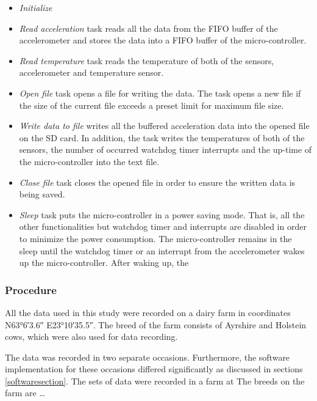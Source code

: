 \documentclass[english,12pt,a4paper,pdftex,elec,utf8]{aaltothesis}
\begin{document}
\begin{itemize}
\item \textit{Initialize}

\item \textit{Read acceleration} task reads all the data from the FIFO buffer of the accelerometer and stores the data into a FIFO buffer of the micro-controller.

\item \textit{Read temperature} task reads the temperature of both of the sensors, accelerometer and temperature sensor.

\item \textit{Open file} task opens a file for writing the data. The task opens a new file if the size of the current file exceeds a preset limit for maximum file size.

\item \textit{Write data to file} writes all the buffered acceleration data into the opened file on the SD card. In addition, the task writes the temperatures of both of the sensors, the number of occurred watchdog timer interrupts and the up-time of the micro-controller into the text file.

\item \textit{Close file} task closes the opened file in order to ensure the written data is being saved. 

\item \textit{Sleep} task puts the micro-controller in a power saving mode. That is, all the other functionalities but watchdog timer and interrupts are disabled in order to minimize the power consumption. The micro-controller remains in the sleep until the watchdog timer or an interrupt from the accelerometer wakes up the micro-controller. After waking up, the 

\end{itemize}

\subsubsection{Procedure} \label{proceduresection}

All the data used in this study were recorded on a dairy farm in coordinates N\ang{63;6;3.6} E\ang{23;10;35.5}. The breed of the farm consists of Ayrshire and Holstein cows, which were also used for data recording. 

The data was recorded in two separate occasions. Furthermore, the software implementation for these occasions differed significantly as discussed in sections \ref{softwaresection}. The sets of data were recorded in a farm at  The breeds on the farm are \dots
\end{document}
